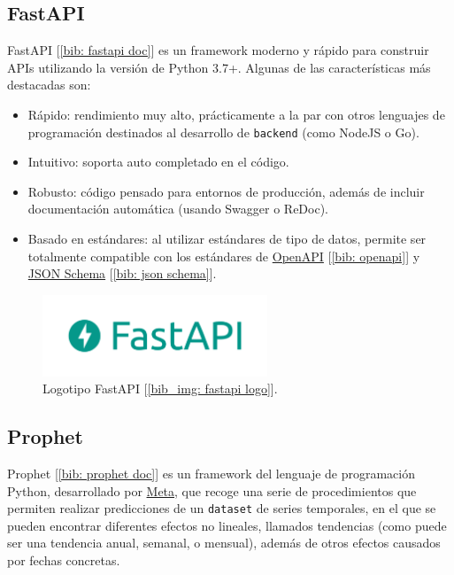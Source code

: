 \documentclass[a4paper, oneside, 12pt]{book}
\begin{document}
	\subsection{FastAPI}
	\label{sec: fastapi}
	
	\noindent FastAPI [\ref{bib: fastapi doc}] es un framework moderno y rápido para construir APIs utilizando la versión de Python 3.7+. Algunas de las características más destacadas son:
	
	\begin{itemize}
		\item Rápido: rendimiento muy alto, prácticamente a la par con otros lenguajes de programación destinados al desarrollo de \texttt{backend} (como NodeJS o Go).
		\item Intuitivo: soporta auto completado en el código.
		\item Robusto: código pensado para entornos de producción, además de incluir documentación automática (usando Swagger o ReDoc).
		\item Basado en estándares: al utilizar estándares de tipo de datos, permite ser totalmente compatible con los estándares de \href{https://github.com/OAI/OpenAPI-Specification}{OpenAPI} [\ref{bib: openapi}] y \href{https://json-schema.org/}{JSON Schema} [\ref{bib: json schema}].
	\end{itemize}
	
	\pagebreak
	
	\begin{figure}[h!]
		\begin{center}
			\includegraphics[width=0.6\textwidth]{img/fastapi_logo.png}
			\caption{Logotipo FastAPI [\ref{bib_img: fastapi logo}].}
			\label{img: fastapi logo}
		\end{center}
	\end{figure}

	\subsection{Prophet}
	\label{sec: prophet}
	
	\noindent Prophet [\ref{bib: prophet doc}] es un framework del lenguaje de programación Python, desarrollado por \href{https://github.com/facebook/}{Meta}, que recoge una serie de procedimientos que permiten realizar predicciones de un \texttt{dataset} de series temporales, en el que se pueden encontrar diferentes efectos no lineales, llamados tendencias (como puede ser una tendencia anual, semanal, o mensual), además de otros efectos causados por fechas concretas. \\
	
\end{document}
